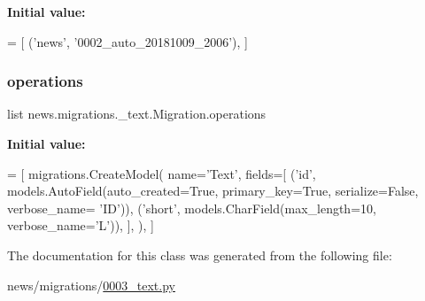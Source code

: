 {\bfseries Initial value\+:}
\begin{DoxyCode}
=  [
        (\textcolor{stringliteral}{'news'}, \textcolor{stringliteral}{'0002\_auto\_20181009\_2006'}),
    ]
\end{DoxyCode}
\mbox{\label{classnews_1_1migrations_1_10003__text_1_1_migration_a3cb1f86200fa9c7e658488f99ddb088a}} 
\subsubsection{\texorpdfstring{operations}{operations}}
{\footnotesize\ttfamily list news.\+migrations.\+\_\+text.\+Migration.\+operations\hspace{0.3cm}{\ttfamily [static]}}

{\bfseries Initial value\+:}
\begin{DoxyCode}
=  [
        migrations.CreateModel(
            name=\textcolor{stringliteral}{'Text'},
            fields=[
                (\textcolor{stringliteral}{'id'}, models.AutoField(auto\_created=\textcolor{keyword}{True}, primary\_key=\textcolor{keyword}{True}, serialize=\textcolor{keyword}{False}, verbose\_name=\textcolor{stringliteral}{
      'ID'})),
                (\textcolor{stringliteral}{'short'}, models.CharField(max\_length=10, verbose\_name=\textcolor{stringliteral}{'L'})),
            ],
        ),
    ]
\end{DoxyCode}


The documentation for this class was generated from the following file\+:\begin{DoxyCompactItemize}
\item 
news/migrations/\mbox{\hyperlink{0003__text_8py}{0003\+\_\+text.\+py}}\end{DoxyCompactItemize}
